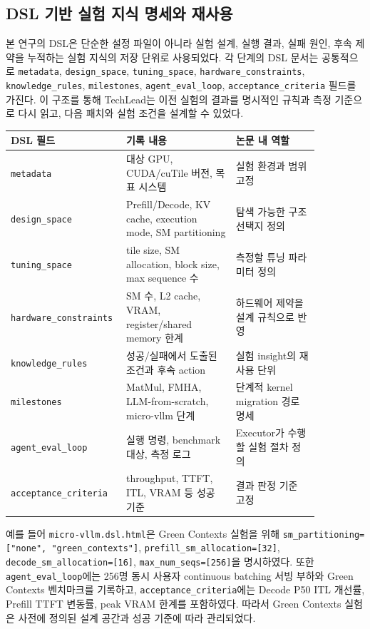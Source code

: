 \documentclass{kcc} %
\begin{document}
\subsection{DSL 기반 실험 지식 명세와 재사용}

본 연구의 DSL은 단순한 설정 파일이 아니라 실험 설계, 실행 결과, 실패 원인, 후속 제약을 누적하는 실험 지식의 저장 단위로 사용되었다. 각 단계의 DSL 문서는 공통적으로 \texttt{metadata}, \texttt{design\_space}, \texttt{tuning\_space}, \texttt{hardware\_constraints}, \texttt{knowledge\_rules}, \texttt{milestones}, \texttt{agent\_eval\_loop}, \texttt{acceptance\_criteria} 필드를 가진다. 이 구조를 통해 TechLead는 이전 실험의 결과를 명시적인 규칙과 측정 기준으로 다시 읽고, 다음 패치와 실험 조건을 설계할 수 있었다.


\begin{table}[h]
\centering
\scriptsize
\setlength{\tabcolsep}{2pt}
\begin{tabular}{|p{0.26\linewidth}|p{0.34\linewidth}|p{0.26\linewidth}|}
\hline
DSL 필드 & 기록 내용 & 논문 내 역할 \\ \hline
\texttt{metadata} & 대상 GPU, CUDA/cuTile 버전, 목표 시스템 & 실험 환경과 범위 고정 \\ \hline
\texttt{design\_space} & Prefill/Decode, KV cache, execution mode, SM partitioning & 탐색 가능한 구조 선택지 정의 \\ \hline
\texttt{tuning\_space} & tile size, SM allocation, block size, max sequence 수 & 측정할 튜닝 파라미터 정의 \\ \hline
\texttt{hardware\_constraints} & SM 수, L2 cache, VRAM, register/shared memory 한계 & 하드웨어 제약을 설계 규칙으로 반영 \\ \hline
\texttt{knowledge\_rules} & 성공/실패에서 도출된 조건과 후속 action & 실험 insight의 재사용 단위 \\ \hline
\texttt{milestones} & MatMul, FMHA, LLM-from-scratch, micro-vllm 단계 & 단계적 kernel migration 경로 명세 \\ \hline
\texttt{agent\_eval\_loop} & 실행 명령, benchmark 대상, 측정 로그 & Executor가 수행할 실험 절차 정의 \\ \hline
\texttt{acceptance\_criteria} & throughput, TTFT, ITL, VRAM 등 성공 기준 & 결과 판정 기준 고정 \\ \hline
\end{tabular}
\end{table}


예를 들어 \texttt{micro-vllm.dsl.html}은 Green Contexts 실험을 위해 \texttt{sm\_partitioning=["none", "green\_contexts"]}, \texttt{prefill\_sm\_allocation=[32]}, \texttt{decode\_sm\_allocation=[16]}, \texttt{max\_num\_seqs=[256]}을 명시하였다. 또한 \texttt{agent\_eval\_loop}에는 256명 동시 사용자 continuous batching 서빙 부하와 Green Contexts 벤치마크를 기록하고, \texttt{acceptance\_criteria}에는 Decode P50 ITL 개선률, Prefill TTFT 변동률, peak VRAM 한계를 포함하였다. 따라서 Green Contexts 실험은 사전에 정의된 설계 공간과 성공 기준에 따라 관리되었다.
\end{document}
